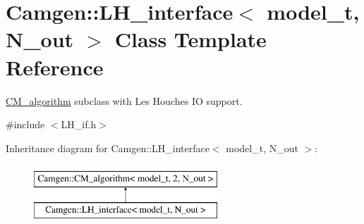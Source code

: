 \hypertarget{a00326}{}\section{Camgen\+:\+:L\+H\+\_\+interface$<$ model\+\_\+t, N\+\_\+out $>$ Class Template Reference}
\label{a00326}


\hyperlink{a00065}{C\+M\+\_\+algorithm} subclass with Les Houches I\+O support.  




{\ttfamily \#include $<$L\+H\+\_\+if.\+h$>$}

Inheritance diagram for Camgen\+:\+:L\+H\+\_\+interface$<$ model\+\_\+t, N\+\_\+out $>$\+:\begin{figure}[H]
\begin{center}
\leavevmode
\includegraphics[height=2.000000cm]{a00326}
\end{center}
\end{figure}
